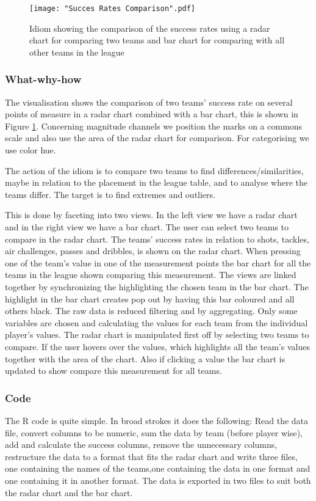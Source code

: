 \documentclass[Report.tex]{subfiles}
\begin{document}
\begin{figure}
\center
\texttt{[image: "Succes Rates Comparison".pdf]}
\caption{Idiom showing the comparison of the success rates using a radar chart for comparing two teams and bar chart for comparing with all other teams in the league}
\label{Fig:SuccesRates}
\end{figure}


\subsubsection{What-why-how}
The visualisation shows the comparison of two teams' success rate on several points of measure in a radar chart combined with a bar chart, this is shown in Figure \ref{Fig:SuccesRates}. Concerning magnitude channels we position the marks on a commons scale and also use the area of the radar chart for comparison. For categorising we use color hue.

The action of the idiom is to compare two teams to find differences/similarities, maybe in relation to the placement in the league table, and to analyse where the teams differ. The target is to find extremes and outliers.

This is done by faceting into two views. In the left view we have a radar chart and in the right view we have a bar chart. The user can select two teams to compare in the radar chart. The teams' success rates in relation to shots, tackles, air challenges, passes and dribbles, is shown on the radar chart. When pressing one of the team's value in one of the measurement points the bar chart for all the teams in the league shown comparing this measurement. The views are linked together by synchronizing the highlighting the chosen team in the bar chart. The highlight in the bar chart creates pop out by having this bar coloured and all others black.
The raw data is reduced filtering and by aggregating. Only some variables are chosen and calculating the values for each team from the individual player's values. 
The radar chart is manipulated first off by selecting two teams to compare. If the user hovers over the values, which highlights all the team's values together with the area of the chart. Also if clicking a value the bar chart is updated to show compare this measurement for all teams.
\subsubsection{Code}
The R code is quite simple. In broad strokes it does the following: Read the data file, convert columns to be numeric, sum the data by team (before player wise), add and calculate the success columns, remove the unnecessary columns, restructure the data to a format that fits the radar chart and write three files, one containing the names of the teams,one containing the data in one format and one containing it in another format. The data is exported in two files to suit both the radar chart and the bar chart.
\end{document}
